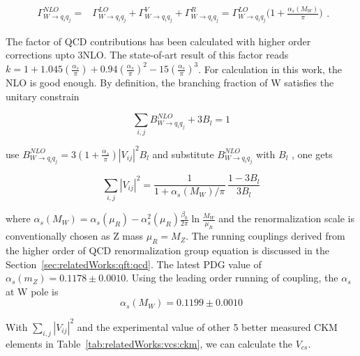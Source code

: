\begin{equation}
\begin{split}
    \Gamma_{W \to q_i q_j}^{NLO} =& \Gamma_{W \to q_i q_j}^{LO} + \Gamma^{V}_{W \to q_i q_j}  + \Gamma^{R}_{W \to q_i q_j}
            =   \Gamma_{W \to q_i q_j}^{LO} \big( 1+ \frac{\alpha_s(M_W)}{\pi}\big)
\end{split} .
\end{equation}

\noindent The factor of QCD contributions has been calculated with higher order corrections upto 3NLO. The state-of-art result of this factor reads $k = 1+1.045 ( \frac{\alpha_s}{\pi} ) + 0.94  ( \frac{\alpha_s}{\pi} ) ^2 -15  ( \frac{\alpha_s}{\pi} ) ^3$. For calculation in this work, the NLO is good enough. By definition, the branching fraction of W satisfies the unitary constrain

\begin{equation}
    \sum_{ i,j } B_{W \to q_i q_j}^{NLO} + 3 B_l = 1
\end{equation}

\noindent use  $B_{W \to q_i q_j}^{NLO} = 3 (1+\frac{\alpha_s}{\pi}) |V_{ij}|^2 B_l $ and substitute $B_{W \to q_i q_j}^{NLO}$  with $B_l$ , one gets

\begin{equation}
    \sum_{ i,j } |V_{ij}|^2 = \frac{1}{ 1+ \alpha_s(M_W)/\pi } \, \frac{1-3B_l}{3B_l}
\end{equation}

\noindent where $\alpha_s(M_W) = \alpha_s(\mu_R) - \alpha^2_s(\mu_R) \frac{ \beta_0}{2\pi} \ln \frac{M_W}{\mu_R}$ and the renormalization scale is conventionally chosen as Z mass $\mu_R=M_Z$. The running couplings derived from the higher order of QCD renormalization group equation is discussed in the Section~\ref{sec:relatedWorks:qft:qcd}. The latest PDG value of $\alpha_s(m_Z)=0.1178\pm0.0010$. Using the leading order running of coupling, the $\alpha_s$ at W pole is
\begin{equation}
	\alpha_s(M_W) = 0.1199 \pm 0.0010
\end{equation}

\noindent  With $\sum_{ i,j } |V_{ij}|^2$ and the experimental value of other 5 better measured CKM elements \cite{pdg2020} in Table~\ref{tab:relatedWorks:vcs:ckm}, we can calculate the $V_{cs}$.



